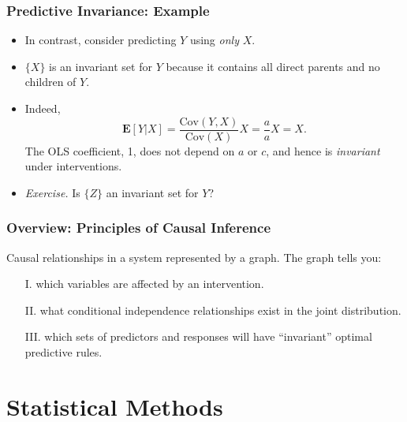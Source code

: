 \documentclass{beamer}
\newcommand{\E}{\textbf{E}}
\newcommand{\Cov}{\text{Cov}}
\begin{document}
\begin{frame}
\frametitle{Predictive Invariance: Example}
\begin{center}
\end{center}
\begin{itemize}
\item In contrast, consider predicting $Y$ using \emph{only} $X$.
\item $\{X\}$ is an invariant set for $Y$ because it contains all direct parents and no children of $Y$.
\item Indeed,
\[
\E[Y|X] = \frac{\Cov(Y, X)}{\Cov(X)} X = \frac{a}{a} X = X.
\]
The OLS coefficient, 1, does not depend on $a$ or $c$, and hence is \emph{invariant} under interventions.
\item \emph{Exercise.} Is $\{Z\}$ an invariant set for $Y$?
\end{itemize}
\end{frame}




\begin{frame}
\frametitle{Overview: Principles of Causal Inference}
Causal relationships in a system represented by a graph.  The graph tells you:
\begin{itemize}
\item[I.] which variables are affected by an intervention.
\item[II.] what conditional independence relationships exist in the joint distribution.
\item[III.] which sets of predictors and responses will have ``invariant'' optimal predictive rules.
\end{itemize}
\end{frame}

\section{Statistical Methods}
\sectionpage
\end{document}
